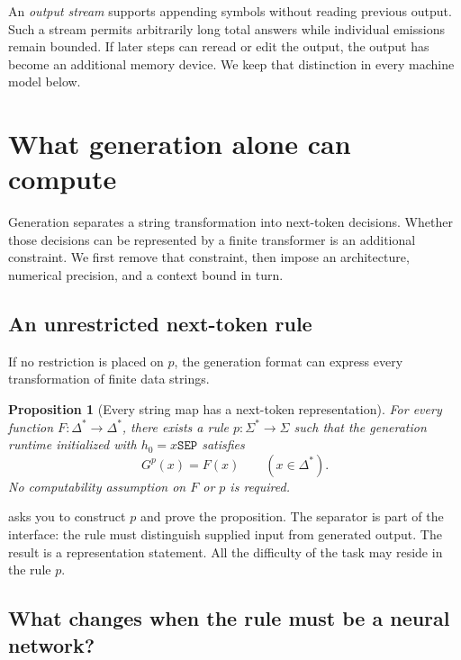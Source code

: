 \documentclass[11pt,twoside]{article}
\newcommand{\sep}{\mathtt{SEP}}
\newtheorem{proposition}[theorem]{Proposition}
\theoremstyle{definition}
\theoremstyle{remark}
\begin{document}
An \emph{output stream} supports appending symbols without reading previous
output. Such a stream permits arbitrarily long total answers while individual
emissions remain bounded. If later steps can reread or edit the output,
the output has become an additional memory device. We keep that distinction
in every machine model below.

\section{What generation alone can compute}
\label{sec:autoregression}

Generation separates a string transformation into next-token decisions.
Whether those decisions can be represented by a finite transformer is an
additional constraint. We first remove that constraint, then impose an
architecture, numerical precision, and a context bound in turn.

\subsection{An unrestricted next-token rule}

If no restriction is placed on $p$, the generation format can express
every transformation of finite data strings.

\begin{proposition}[Every string map has a next-token representation]
\label{prop:arbitrary-rule}
For every function $F:\Delta^*\to\Delta^*$, there exists a rule
$p:\Sigma^*\to\Sigma$ such that the generation runtime initialized with
$h_0=x\sep$ satisfies
\begin{equation}
 G^p(x)=F(x)\qquad(x\in\Delta^*).
 \label{eq:arbitrary-rule}
\end{equation}
No computability assumption on $F$ or $p$ is required.
\end{proposition}

 asks you to construct $p$ and
prove the proposition. The separator is part of the interface: the rule
must distinguish supplied input from generated output. The result is a
representation statement. All the difficulty of the task may reside in
the rule $p$.

\subsection{What changes when the rule must be a neural network?}
\end{document}
